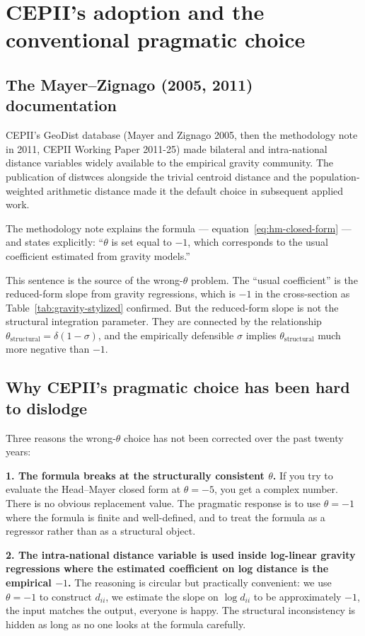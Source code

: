 \documentclass[11pt,letterpaper,oneside]{book}
\theoremstyle{definition}
\theoremstyle{remark}
\begin{document}
\chapter{CEPII's adoption and the conventional pragmatic choice}

\section{The Mayer--Zignago (2005, 2011) documentation}

CEPII's GeoDist database (Mayer and Zignago 2005, then the methodology note in 2011, CEPII Working Paper 2011-25) made bilateral and intra-national distance variables widely available to the empirical gravity community. The publication of distwces alongside the trivial centroid distance and the population-weighted arithmetic distance made it the default choice in subsequent applied work.

The methodology note explains the formula --- equation~\eqref{eq:hm-closed-form} --- and states explicitly: ``$\theta$ is set equal to $-1$, which corresponds to the usual coefficient estimated from gravity models.''

This sentence is the source of the wrong-$\theta$ problem. The ``usual coefficient'' is the reduced-form slope from gravity regressions, which is $-1$ in the cross-section as Table~\ref{tab:gravity-stylized} confirmed. But the reduced-form slope is not the structural integration parameter. They are connected by the relationship $\theta_{\text{structural}} = \delta(1-\sigma)$, and the empirically defensible $\sigma$ implies $\theta_{\text{structural}}$ much more negative than $-1$.

\section{Why CEPII's pragmatic choice has been hard to dislodge}

Three reasons the wrong-$\theta$ choice has not been corrected over the past twenty years:

\textbf{1. The formula breaks at the structurally consistent $\theta$.} If you try to evaluate the Head--Mayer closed form at $\theta = -5$, you get a complex number. There is no obvious replacement value. The pragmatic response is to use $\theta = -1$ where the formula is finite and well-defined, and to treat the formula as a regressor rather than as a structural object.

\textbf{2. The intra-national distance variable is used inside log-linear gravity regressions where the estimated coefficient on log distance is the empirical $-1$.} The reasoning is circular but practically convenient: we use $\theta = -1$ to construct $d_{ii}$, we estimate the slope on $\log d_{ii}$ to be approximately $-1$, the input matches the output, everyone is happy. The structural inconsistency is hidden as long as no one looks at the formula carefully.
\end{document}

